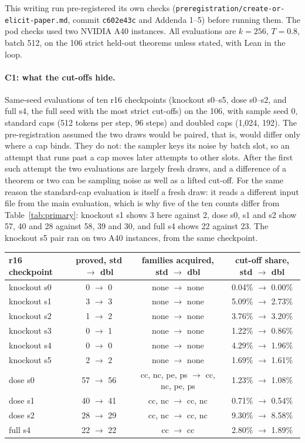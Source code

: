 This writing run pre-registered its own checks (\texttt{preregistration/create-or-elicit-paper.md}, commit
\texttt{c602e43c} and Addenda 1--5) before running them. The pod checks used two NVIDIA A40 instances. All evaluations
are $k=256$, $T=0.8$, batch 512, on the 106 strict held-out theorems unless stated, with Lean in the loop.

\paragraph{C1: what the cut-offs hide.} \rv{} Same-seed evaluations of ten r16 checkpoints (knockout s0--s5, dose s0--s2, and full s4,
the full seed with the most strict cut-offs) on the 106, with sample seed 0, standard caps (512 tokens per step, 96 steps) and doubled caps (1,024, 192). The pre-registration
assumed the \rv{} two draws would be paired, that is, would differ only where a cap binds. They do not: the sampler keys its noise by batch slot, so
an attempt that runs past a cap moves later attempts to other slots. After the first such
attempt the two evaluations are largely fresh draws, and a difference of a theorem or two can be sampling noise as well
as a lifted cut-off. For the same reason the standard-cap evaluation is itself a fresh draw: it reads a different input
file from the main evaluation, which is why \rv{} five of the ten counts differ from Table~\ref{tab:primary}: knockout s1
shows 3 here against 2, dose s0, s1 and s2 show 57, 40 and 28 against 58, 39 and 30, and full s4 shows 22 against 23. The knockout s5 pair ran on two A40 instances, from the same checkpoint.
\begin{center}\footnotesize
\begin{tabular}{lccc}
\toprule
r16 checkpoint & proved, std $\to$ dbl & families acquired, std $\to$ dbl & cut-off share, std $\to$ dbl \\
\midrule
knockout s0 & 0 $\to$ 0 & none $\to$ none & 0.04\% $\to$ 0.00\% \\
knockout s1 & 3 $\to$ 3 & none $\to$ none & 5.09\% $\to$ 2.73\% \\
knockout s2 & 1 $\to$ 2 & none $\to$ none & 3.76\% $\to$ 3.20\% \\
knockout s3 & 0 $\to$ 1 & none $\to$ none & 1.22\% $\to$ 0.86\% \\
knockout s4 & 0 $\to$ 0 & none $\to$ none & 4.29\% $\to$ 1.96\% \\
knockout s5 & 2 $\to$ 2 & none $\to$ none & 1.69\% $\to$ 1.61\% \\
dose s0 & 57 $\to$ 56 & cc, nc, pe, ps $\to$ cc, nc, pe, ps & 1.23\% $\to$ 1.08\% \\
dose s1 & 40 $\to$ 41 & cc, nc $\to$ cc, nc & 0.71\% $\to$ 0.54\% \\
dose s2 & 28 $\to$ 29 & cc, nc $\to$ cc, nc & 9.30\% $\to$ 8.58\% \\
full s4 & 22 $\to$ 22 & cc $\to$ cc & 2.80\% $\to$ 1.89\% \\
\bottomrule
\end{tabular}
\end{center}

